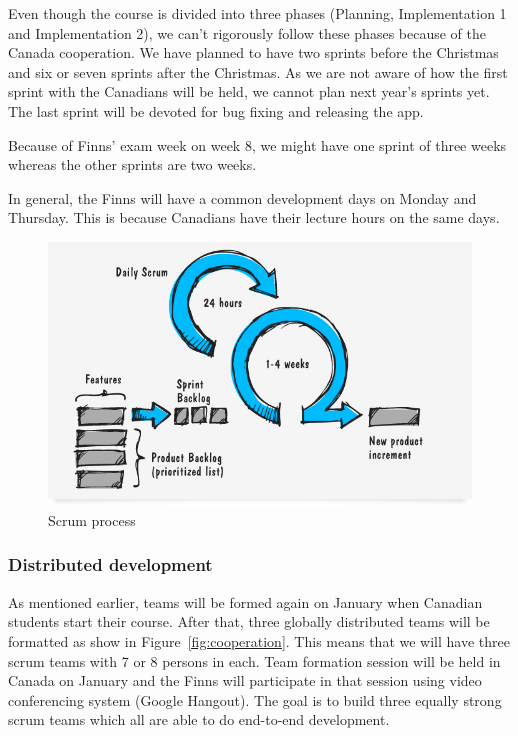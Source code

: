 Even though the course is divided into three phases (Planning, Implementation 1
and Implementation 2), we can't rigorously follow these phases because of the
Canada cooperation. We have planned to have two sprints before the Christmas and
six or seven sprints after the Christmas. As we are not aware of how the first
sprint with the Canadians will be held, we cannot plan next year's sprints yet.
The last sprint will be devoted for bug fixing and releasing the app.

Because of Finns' exam week on week 8, we might have one sprint of three weeks
whereas the other sprints are two weeks. 

In general, the Finns will have a common development days on Monday and
Thursday. This is because Canadians have their lecture hours on the same days.

\begin{figure}[H]
\centering
\includegraphics[width=1\textwidth]{imgs/scrum_process_en.png}
\caption{Scrum process}
\label{fig:scrum}
\end{figure}

\subsubsection{Distributed development}

As mentioned earlier, teams will be formed again on January when
Canadian students start their course. After that, three globally
distributed teams will be formatted as show in Figure~\ref{fig:cooperation}.
This means that we will have three scrum teams with 7 or 8 persons in each. Team
formation session will be held in Canada on January and the Finns will
participate in that session using video conferencing system (Google Hangout).
The goal is to build three equally strong scrum teams which all are able to do
end-to-end development.

